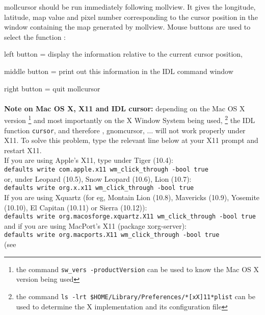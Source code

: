 \begin{codedescription}
{mollcursor should be run immediately following mollview. It gives the
longitude, latitude, map value and pixel number
corresponding to the cursor position in the window containing the map generated
by mollview. Mouse buttons are used to select the function :  

left button = display the information relative to the current cursor position, 

middle button = print out this information in the IDL command window 

right button = quit mollcursor\\
\\
{\bf{Note on Mac OS X, X11 and IDL cursor:}} 
depending on the Mac OS X version%
\footnote{the command {\tt sw\_vers -productVersion}
 can be used to know the Mac OS X version being used}
and most importantly on the X Window System being used,%
\footnote{the command
{\tt ls -lrt  \$HOME/Library/Preferences/*[xX]11*plist}
can be used to determine the X implementation and its configuration file}
the IDL function {\tt cursor}, and therefore \healpix \thedocid,
gnomcursor, $\ldots$ will not
work properly under X11. To solve this problem, type the relevant line below at your X11 prompt and restart X11.\\
If you are using Apple's X11, type under Tiger (10.4): \\
{\footnotesize {\tt defaults write com.apple.x11 wm\_click\_through -bool true}} \\
or, under Leopard (10.5), Snow Leopard (10.6), Lion (10.7): \\
{\footnotesize {\tt defaults write org.x.x11 wm\_click\_through -bool true}} \\
If you are using Xquartz (for eg, Montain Lion (10.8), Mavericks (10.9), Yosemite (10.10), El Capitan (10.11) or Sierra (10.12)): \\
{\footnotesize {\tt defaults write org.macosforge.xquartz.X11 wm\_click\_through -bool true}}\\
and if you are using MacPort's X11 (package xorg-server):\\
{\footnotesize {\tt defaults write org.macports.X11 wm\_click\_through -bool true}}\\
(see
}
\end{codedescription}
